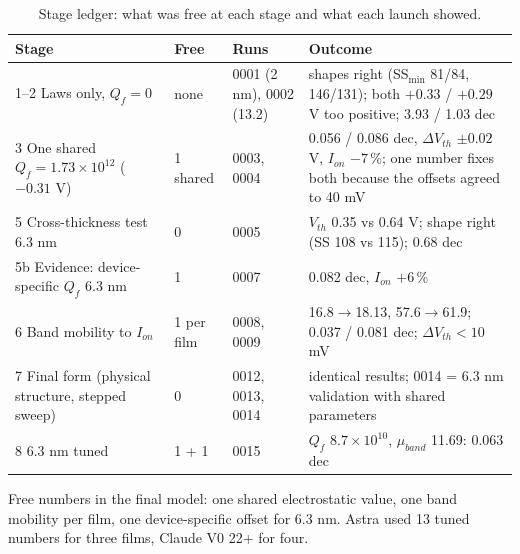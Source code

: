 \documentclass[11pt,a4paper]{article}
\begin{document}
\begin{table}[H]\centering\footnotesize
\caption{Stage ledger: what was free at each stage and what each launch showed.}\label{tab:stages}
\begin{tabular}{p{4.2cm}p{1.6cm}p{2.2cm}p{7.2cm}}\toprule
Stage & Free & Runs & Outcome\\\midrule
1--2 Laws only, $Q_f=0$ & none & 0001 (2 nm), 0002 (13.2) & shapes right (SS$_{\min}$ 81/84, 146/131); both $+0.33$ / $+0.29$ V too positive; 3.93 / 1.03 dec\\
3 One shared $Q_f=1.73\times10^{12}$ ($-0.31$ V) & 1 shared & 0003, 0004 & 0.056 / 0.086 dec, $\Delta V_{th}$ $\pm0.02$ V, $I_{on}$ $-7$\,\%; one number fixes both because the offsets agreed to 40 mV\\
5 Cross-thickness test 6.3 nm & 0 & 0005 & $V_{th}$ 0.35 vs 0.64 V; shape right (SS 108 vs 115); 0.68 dec\\
5b Evidence: device-specific $Q_f$ 6.3 nm & 1 & 0007 & 0.082 dec, $I_{on}$ $+6$\,\%\\
6 Band mobility to $I_{on}$ & 1 per film & 0008, 0009 & 16.8$\to$18.13, 57.6$\to$61.9; 0.037 / 0.081 dec; $\Delta V_{th}<10$ mV\\
7 Final form (physical structure, stepped sweep) & 0 & 0012, 0013, 0014 & identical results; 0014 = 6.3 nm validation with shared parameters\\
8 6.3 nm tuned & 1 + 1 & 0015 & $Q_f$ $8.7\times10^{10}$, $\mu_{band}$ 11.69: 0.063 dec\\
\bottomrule\end{tabular}
\end{table}
Free numbers in the final model: one shared electrostatic value, one band mobility per film, one device-specific offset for 6.3 nm. Astra used 13 tuned numbers for three films, Claude V0 22+ for four.

\end{document}
